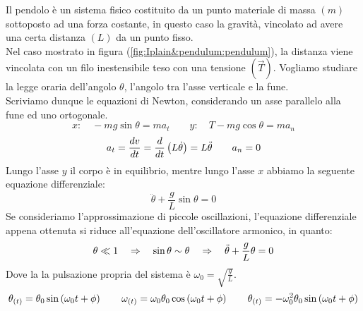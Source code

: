 Il pendolo è un sistema fisico costituito da un punto materiale di massa
$(m)$ sottoposto ad una forza costante, in questo caso la gravità, vincolato
ad avere una certa distanza $(L)$ da un punto fisso.\\
Nel caso mostrato in figura (\ref{fig:Iplain&pendulum:pendulum}), la distanza
viene vincolata con un filo inestensibile teso con una tensione $(\vec T)$.
Vogliamo studiare la legge oraria dell'angolo $\theta$, l'angolo tra l'asse
verticale e la fune.\\
Scriviamo dunque le equazioni di Newton, considerando un asse parallelo alla
fune ed uno ortogonale.
\begin{equation}
    x:\quad -mg\sin\theta = ma_t\quad\quad y:\quad T-mg\cos\theta = ma_n
\end{equation}
\begin{equation}
    a_t = \frac{dv}{dt}=\frac d{dt}\left( L\dot\theta\right)=
    L\ddot\theta\quad\quad a_n = 0
\end{equation}
Lungo l'asse $y$ il corpo è in equilibrio, mentre lungo l'asse $x$ abbiamo
la seguente equazione differenziale:
\begin{equation}
    \boxed{\ddot\theta + \frac gL\sin\theta = 0}
\label{eq:pendulum_DE}
\end{equation}
Se consideriamo l'approssimazione di piccole oscillazioni, l'equazione differenziale appena ottenuta si riduce all'equazione dell'oscillatore armonico, in quanto:
\begin{equation}
    \theta \ll 1 \quad\Rightarrow\quad \sin\theta \sim \theta \quad\Rightarrow\quad
    \ddot\theta + \frac gL\theta = 0
\label{eq:pendulum_ODE}
\end{equation}
Dove la la pulsazione propria del sistema è $\omega_0 = \sqrt{\frac gL}$.
\begin{equation}
    \theta_{(t)} = \theta_0\sin\left(\omega_0t+\phi\right)\quad\quad
    \omega_{(t)} = \omega_0\theta_0\cos\left(\omega_0t+\phi\right)\quad\quad
    \theta_{(t)} =-\omega_0^2 \theta_0\sin\left(\omega_0t+\phi\right)
\end{equation}